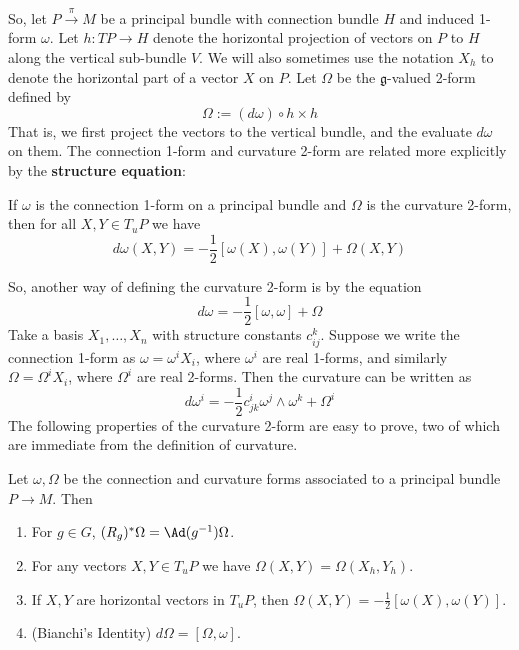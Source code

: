 So, let $P \stackrel{\pi}{\rightarrow} M$ be a principal bundle with connection bundle $H$ and induced 1-form $\omega$. Let $h : TP \rightarrow H$ denote the horizontal projection of vectors on $P$ to $H$ along the vertical sub-bundle $V$. We will also sometimes use the notation $X_h$ to denote the horizontal part of a vector $X$ on $P$. Let $\Omega$ be the $\mathfrak g$-valued 2-form defined by
\[ \Omega := (d\omega) \circ h \times h \]
That is, we first project the vectors to the vertical bundle, and the evaluate $d\omega$ on them. The connection 1-form and curvature 2-form are related more explicitly by the \textbf{structure equation}:
\begin{prop}
If $\omega$ is the connection 1-form on a principal bundle and $\Omega$ is the curvature 2-form, then for all $X,Y \in T_u P$ we have
\[ d\omega(X,Y) = -\frac{1}{2} [\omega(X),\omega(Y)] + \Omega(X,Y) \]
\end{prop}
So, another way of defining the curvature 2-form is by the equation
\begin{equation}
\label{explicit principal bundle curvature}
d\omega = -\frac{1}{2} [\omega,\omega] + \Omega
\end{equation}
Take a basis $X_1,\ldots,X_n$ with structure constants $c_{ij}^k$. Suppose we write the connection 1-form as $\omega = \omega^i X_i$, where $\omega^i$ are real 1-forms, and similarly $\Omega = \Omega^i X_i$, where $\Omega^i$ are real 2-forms. Then the curvature can be written as
\begin{equation}
\label{principal bundle structure equation in basis}
d\omega^i = -\frac{1}{2} c_{jk}^i \omega^j \wedge \omega^k + \Omega^i
\end{equation}
The following properties of the curvature 2-form are easy to prove, two of which are immediate from the definition of curvature.
\begin{prop}
Let $\omega,\Omega$ be the connection and curvature forms associated to a principal bundle $P \rightarrow M$. Then
\begin{enumerate}
	\item For $g \in G$, $(R_g)^* \Omega = \Ad(g^{-1})\Omega$.
	\item For any vectors $X,Y \in T_u P$ we have $\Omega(X,Y) = \Omega(X_h,Y_h)$. 
	\item If $X,Y$ are horizontal vectors in $T_u P$, then $\Omega(X,Y) = -\frac{1}{2}[\omega(X),\omega(Y)]$.
	\item(Bianchi's Identity) $d\Omega = [\Omega,\omega]$.
\end{enumerate}
\end{prop}
